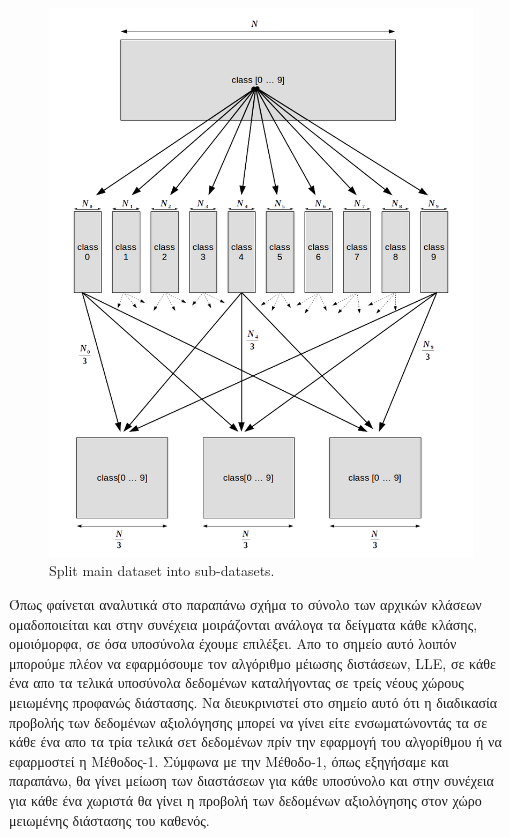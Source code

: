 \newpage
\begin{figure}[t!]
\centering
\includegraphics[scale=0.8]{figs/5.png}
\newline
\caption{ \textlatin{Split main dataset into sub-datasets}.} 
\end{figure}
\newpage
\par
Όπως φαίνεται αναλυτικά στο παραπάνω σχήμα το σύνολο των αρχικών κλάσεων ομαδοποιείται και στην συνέχεια μοιράζονται ανάλογα τα δείγματα κάθε κλάσης, ομοιόμορφα, σε όσα υποσύνολα έχουμε επιλέξει. Απο το σημείο αυτό λοιπόν μπορούμε πλέον να εφαρμόσουμε τον αλγόριθμο μέιωσης διστάσεων, \textlatin{LLE}, σε κάθε ένα απο τα τελικά υποσύνολα δεδομένων καταλήγοντας σε τρείς νέους χώρους μειωμένης προφανώς διάστασης. Να διευκρινιστεί στο σημείο αυτό ότι η διαδικασία προβολής των δεδομένων αξιολόγησης μπορεί να γίνει είτε ενσωματώνοντάς τα σε κάθε ένα απο τα τρία τελικά σετ δεδομένων πρίν την εφαρμογή του αλγορίθμου ή να εφαρμοστεί η Μέθοδος-1. Σύμφωνα με την Μέθοδο-1, όπως εξηγήσαμε και παραπάνω, θα γίνει μείωση των διαστάσεων για κάθε υποσύνολο και στην συνέχεια για κάθε ένα χωριστά θα γίνει η προβολή των δεδομένων αξιολόγησης στον χώρο μειωμένης διάστασης του καθενός. 
